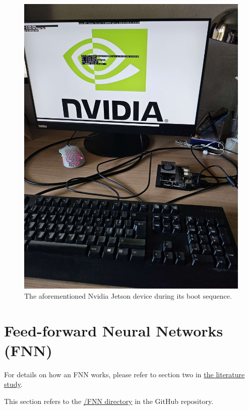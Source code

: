 \documentclass{article}
\begin{document}
\begin{figure}[htbp]
    \centering
    \includegraphics[width=0.5\paperwidth]{images/JetsonBoot.jpg}
    \caption{The aforementioned Nvidia Jetson device during its boot sequence.}
    \label{fig:JetsonBoot}
\end{figure}

\newpage
\tableofcontents
\newpage

\section{Feed-forward Neural Networks (FNN)}
For details on how an FNN works, please refer to section two in \href{https://github.com/AntonStantan/matura/blob/main/zwischenProdukt/LiteraturstudieAnton.pdf}{the literature study}.

This section refers to the \href{https://github.com/AntonStantan/matura/tree/main/FNN}{/FNN directory} in the GitHub repository.
\end{document}
